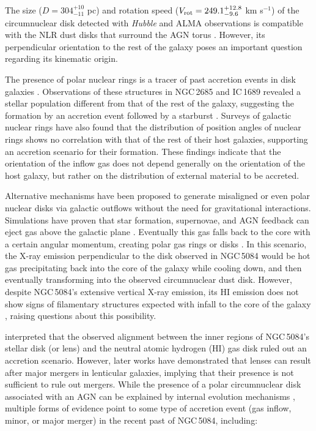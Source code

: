 \documentclass[modern]{CORE-AAS/aastex631}
\begin{document}
The size ($D=304^{+10}_{-11}$ pc) and rotation speed ($V_{\rm rot} = 249.1^{+12.8}_{-9.6}$ km s$^{-1}$) of the circumnuclear disk detected with \emph{Hubble} and ALMA observations is compatible with the NLR dust disks that surround the AGN torus \citep[][]{ramosalmeida+2017nat1_679}. However, its perpendicular orientation to the rest of the galaxy poses an important question regarding its kinematic origin. \par 

The presence of polar nuclear rings is a tracer of past accretion events in disk galaxies \citep{anantharamaiah+1996apj466_13}. Observations of these structures in NGC\,2685 and IC\,1689 revealed a stellar population different from that of the rest of the galaxy, suggesting the formation by an accretion event followed by a starburst \citep{silchenko1998aap330_412}. Surveys of galactic nuclear rings \citep{comeron+2010mnras402_2462} have also found that the distribution of position angles of nuclear rings shows no correlation with that of the rest of their host galaxies, supporting an accretion scenario for their formation. These findings indicate that the orientation of the inflow gas does not depend generally on the orientation of the host galaxy, but rather on the distribution of external material to be accreted. 

Alternative mechanisms have been proposed to generate misaligned or even polar nuclear disks via galactic outflows without the need for gravitational interactions. Simulations have proven that star formation, supernovae, and AGN feedback can eject gas above the galactic plane \citep{emsellem+2015mnras446_2468, renaud+2015mnras454_3299}. Eventually this gas falls back to the core with a certain angular momentum, creating polar gas rings or disks \citep{combes2017inproceedings_Di}. In this scenario, the X-ray emission perpendicular to the disk observed in NGC\,5084 would be hot gas precipitating back into the core of the galaxy while cooling down, and then eventually transforming into the observed circumnuclear dust disk. However, despite NGC\,5084's extensive vertical X-ray emission, its HI emission does not show signs of filamentary structures expected with infall to the core of the galaxy  \citep{zheng+2022afz22_085004}, raising questions about this possibility.

\citet{gottesman+1986mnras219_759} interpreted that the observed alignment between the inner regions of NGC\,5084's stellar disk (or lens) and the neutral atomic hydrogen (HI) gas disk ruled out an accretion scenario. However, later works \citep{elichemoral+2018aap617_113} have demonstrated that lenses can result after major mergers in lenticular galaxies, implying that their presence is not sufficient to rule out mergers. While the presence of a polar circumnuclear disk associated with an AGN can be explained by internal evolution mechanisms \citep[outflow gas cooling and subsequent precipitation onto the core,][]{combes2017inproceedings_Di}, multiple forms of evidence point to some type of accretion event (gas inflow, minor, or major merger) in the recent past of NGC\,5084, including:
\end{document}
